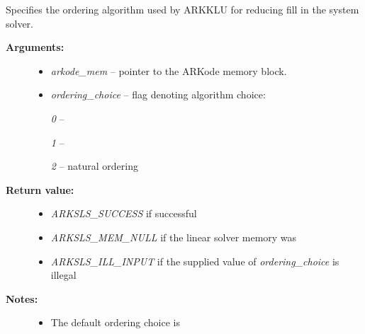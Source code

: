 \documentclass[letterpaper,10pt,english]{sphinxmanual}
\begin{document}
\begin{fulllineitems}
\label{c_interface/User_callable:c.ARKKLUSetOrdering}
Specifies the ordering algorithm used by ARKKLU for reducing fill
in the system solver.
\begin{description}
\item[{\textbf{Arguments:}}] \leavevmode\begin{itemize}
\item {} 
\emph{arkode\_mem} -- pointer to the ARKode memory block.

\item {} 
\emph{ordering\_choice} -- flag denoting algorithm choice:

\emph{0} -- 

\emph{1} -- 

\emph{2} -- natural ordering

\end{itemize}

\item[{\textbf{Return value:}}] \leavevmode\begin{itemize}
\item {} 
\emph{ARKSLS\_SUCCESS}  if successful

\item {} 
\emph{ARKSLS\_MEM\_NULL} if the linear solver memory was 

\item {} 
\emph{ARKSLS\_ILL\_INPUT} if the supplied value of \emph{ordering\_choice} is illegal

\end{itemize}

\item[{\textbf{Notes:}}] \leavevmode\begin{itemize}
\item {} 
The default ordering choice is 

\end{itemize}

\end{description}

\end{fulllineitems}

\end{document}
